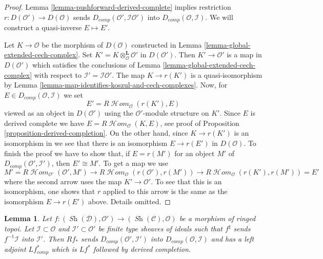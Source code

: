 \documentclass{stacks-project}
\theoremstyle{plain}
\newtheorem{lemma}[subsection]{Lemma}
\theoremstyle{definition}
\theoremstyle{remark}
\numberwithin{equation}{subsection}
\def\SheafHom{\mathop{\mathcal{H}\!\mathit{om}}\nolimits}
\def\Sh{\mathop{\mathit{Sh}}\nolimits}
\begin{document}
\begin{proof}
Lemma \ref{lemma-pushforward-derived-complete} implies
restriction $r : D(\mathcal{O}') \to D(\mathcal{O})$
sends $D_{comp}(\mathcal{O}', \mathcal{I}\mathcal{O}')$
into $D_{comp}(\mathcal{O}, \mathcal{I})$. We will construct a
quasi-inverse $E \mapsto E'$.

\medskip\noindent
Let $K \to \mathcal{O}$ be the morphism of $D(\mathcal{O})$
constructed in Lemma \ref{lemma-global-extended-cech-complex}. 
Set $K' = K \otimes_\mathcal{O}^\mathbf{L} \mathcal{O}'$ in $D(\mathcal{O}')$.
Then $K' \to \mathcal{O}'$ is a map in $D(\mathcal{O}')$ which
satisfies the conclusions of Lemma \ref{lemma-global-extended-cech-complex}
with respect to $\mathcal{I}' = \mathcal{I}\mathcal{O}'$.
The map $K \to r(K')$ is a quasi-isomorphism by
Lemma \ref{lemma-map-identifies-koszul-and-cech-complexes}.
Now, for $E \in D_{comp}(\mathcal{O}, \mathcal{I})$ we set
$$
E' = R\SheafHom_\mathcal{O}(r(K'), E)
$$
viewed as an object in $D(\mathcal{O}')$ using the $\mathcal{O}'$-module
structure on $K'$. Since $E$ is derived complete
we have $E = R\SheafHom_\mathcal{O}(K, E)$, see
proof of Proposition \ref{proposition-derived-completion}.
On the other hand, since $K \to r(K')$ is an isomorphism in
we see that there is an isomorphism
$E \to r(E')$ in $D(\mathcal{O})$. To finish the proof we
have to show that, if $E = r(M')$ for an object $M'$ of
$D_{comp}(\mathcal{O}', \mathcal{I}')$, then
$E' \cong M'$. To get a map we use
$$
M' = R\SheafHom_{\mathcal{O}'}(\mathcal{O}', M') \to
R\SheafHom_\mathcal{O}(r(\mathcal{O}'), r(M')) \to
R\SheafHom_\mathcal{O}(r(K'), r(M')) = E'
$$
where the second arrow uses the map $K' \to \mathcal{O}'$.
To see that this is an isomorphism, one shows that $r$ applied
to this arrow is the same as the isomorphism $E \to r(E')$ above.
Details omitted.
\end{proof}

\begin{lemma}
\label{lemma-pushforward-derived-complete-adjoint}
Let $f : (\Sh(\mathcal{D}), \mathcal{O}') \to (\Sh(\mathcal{C}), \mathcal{O})$
be a morphism of ringed topoi. Let $\mathcal{I} \subset \mathcal{O}$
and $\mathcal{I}' \subset \mathcal{O}'$ 
be finite type sheaves of ideals such that $f^\sharp$ sends
$f^{-1}\mathcal{I}$ into $\mathcal{I}'$.
Then $Rf_*$ sends $D_{comp}(\mathcal{O}', \mathcal{I}')$
into $D_{comp}(\mathcal{O}, \mathcal{I})$ and has a left adjoint
$Lf_{comp}^*$ which is $Lf^*$ followed by derived completion.
\end{lemma}
\end{document}
